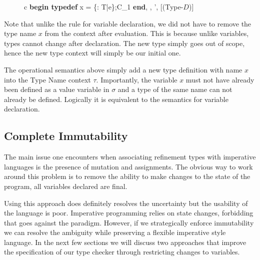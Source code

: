 \documentclass[a4paper,12pt]{report}
\begin{document}
\begin{figure}[H]
  \begin{center}
    \begin{tabular} {c}
      {\langle \textbf{begin typedef }x = \{\upsilon : T\text{ }|\text{ }e\};C_1\textbf{ end}, 
      \sigma, \tau \rangle \longrightarrow 
        \langle \sigma', \tau \rangle} [(Type-$D$)]
    \end{tabular}
  \end{center}
\end{figure}

\par
Note that unlike the rule for variable declaration, we did not have to remove 
the type name $x$ from the context after evaluation. This is because unlike 
variables, types cannot change after declaration. The new type simply goes 
out of scope, hence the new type context will simply be our initial one. 

\par
The operational semantics above simply add a new type definition with name $x$ 
into the Type Name context $\tau$. Importantly, the variable $x$ must not have 
already been defined as a value variable in $\sigma$ and a type of the same name 
can not already be defined. Logically it is equivalent to the semantics for 
variable declaration.

\subsection{Complete Immutability}
The main issue one encounters when associating refinement types with imperative 
languages is the presence of mutation and assignments. The obvious way to 
work around this problem is to remove the ability to make changes to the state 
of the program, all variables declared are final.

\par
Using this approach does definitely resolves the uncertainty but the usability of 
the language is poor. Imperative programming relies on state changes, forbidding 
that goes against the paradigm. However, if we strategically enforce immutability 
we can resolve the ambiguity while preserving a flexible imperative style 
language. In the next few sections we will discuss two approaches that 
improve the specification of our type checker through restricting changes to 
variables. 
\end{document}
